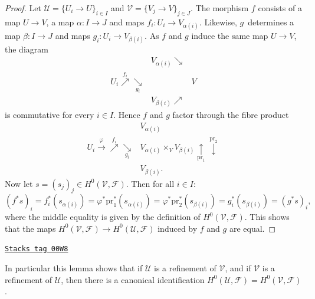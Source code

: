 \begin{proof}
Let $\mathcal{U} = \{U_i \to U\}_{i\in I}$ and
$\mathcal{V} = \{V_j \to V\}_{j\in J}$.
The morphism $f$ consists of a map $U\to V$, a map $\alpha : I \to J$ and
maps $f_i : U_i \to V_{\alpha(i)}$.
Likewise, $g$~determines a map $\beta : I \to J$ and maps
$g_i : U_i \to V_{\beta(i)}$.
As $f$ and $g$ induce the same map $U\to V$, the diagram
$$
\begin{array}{ccc} & V_{\alpha(i)} \searrow &  \\ U_i \overset{f_i}{\nearrow}\underset{g_i}{\searrow} &  & V \\  & V_{\beta(i)} \nearrow & \end{array}
$$
is commutative for every $i\in I$. Hence $f$ and $g$ factor through
the fibre product
$$
\begin{array}{cc} & V_{\alpha(i)} \\ U_i \overset{\varphi}{\longrightarrow}\overset{f_i}{\nearrow}\underset{g_i}{\searrow} & V_{\alpha(i)} \times_V V_{\beta(i)} \underset{\text{pr}_1}{\uparrow}\overset{\text{pr}_2}{\downarrow} \\  & V_{\beta(i)}.\end{array}
$$
Now let $s = (s_j)_j \in H^0(\mathcal{V}, \mathcal{F})$.
Then for all $i\in I$:
$$
(f^*s)_i
=
f_i^*(s_{\alpha(i)})
=
\varphi^*\text{pr}_1^*(s_{\alpha(i)})
=
\varphi^*\text{pr}_2^*(s_{\beta(i)})
=
g_i^*(s_{\beta(i)})
=
(g^*s)_i,
$$
where the middle equality is given by the definition
of $H^0(\mathcal{V}, \mathcal{F})$.
This shows that the maps
$H^0(\mathcal{V}, \mathcal{F}) \to H^0(\mathcal{U}, \mathcal{F})$
induced by $f$ and $g$ are equal.
\end{proof}

\begin{remark}
\label{sites-remark-both-refine-same-H0}
\href{https://stacks.math.columbia.edu/tag/00W8}{\texttt{Stacks tag 00W8}}

In particular this lemma shows that if $\mathcal{U}$ is
a refinement of $\mathcal{V}$, and if $\mathcal{V}$ is a
refinement of $\mathcal{U}$, then there is a canonical
identification $H^0(\mathcal{U}, \mathcal{F}) =
H^0(\mathcal{V}, \mathcal{F})$.
\end{remark}

